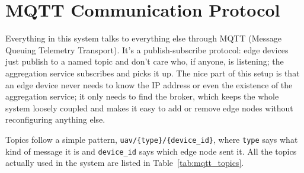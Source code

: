 \documentclass[12pt,a4paper]{report}
\begin{document}
\section{MQTT Communication Protocol}

Everything in this system talks to everything else through MQTT (Message
Queuing Telemetry Transport). It's a publish-subscribe protocol: edge
devices just publish to a named topic and don't care who, if anyone, is
listening; the aggregation service subscribes and picks it up. The nice
part of this setup is that an edge device never needs to know the IP
address or even the existence of the aggregation service; it only needs
to find the broker, which keeps the whole system loosely coupled and makes
it easy to add or remove edge nodes without reconfiguring anything else.

Topics follow a simple pattern, \texttt{uav/\{type\}/\{device\_id\}}, where
\texttt{type} says what kind of message it is and \texttt{device\_id} says
which edge node sent it. All the topics actually used in the system are
listed in Table~\ref{tab:mqtt_topics}.
\end{document}
